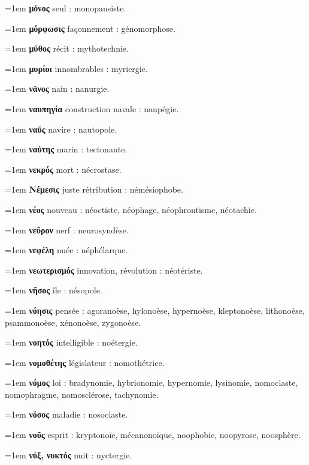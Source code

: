\hangindent=1em \textbf{μόνος} seul : monopausiste.\par
\hangindent=1em \textbf{μόρφωσις} façonnement : génomorphose.\par
\hangindent=1em \textbf{μῦθος} récit : mythotechnie.\par
\hangindent=1em \textbf{μυρίοι} innombrables : myriergie.\par
\hangindent=1em \textbf{νᾶνος} nain : nanurgie.\par
\hangindent=1em \textbf{ναυπηγία} construction navale : naupégie.\par
\hangindent=1em \textbf{ναῦς} navire : nautopole.\par
\hangindent=1em \textbf{ναύτης} marin : tectonaute.\par
\hangindent=1em \textbf{νεκρός} mort : nécrostase.\par
\hangindent=1em \textbf{Νέμεσις} juste rétribution : némésiophobe.\par
\hangindent=1em \textbf{νέος} nouveau : néoctiste, néophage, néophrontisme, néotachie.\par
\hangindent=1em \textbf{νεῦρον} nerf : neurosyndèse.\par
\hangindent=1em \textbf{νεφέλη} nuée : néphélarque.\par
\hangindent=1em \textbf{νεωτερισμός} innovation, révolution : néotériste.\par
\hangindent=1em \textbf{νῆσος} île : nésopole.\par
\hangindent=1em \textbf{νόησις} pensée : agoranoèse, hylonoèse, hypernoèse, kleptonoèse, lithonoèse, psammonoèse, xénonoèse, zygonoèse.\par
\hangindent=1em \textbf{νοητός} intelligible : noétergie.\par
\hangindent=1em \textbf{νομοθέτης} législateur : nomothétrice.\par
\hangindent=1em \textbf{νόμος} loi : bradynomie, hybrionomie, hypernomie, lysinomie, nomoclaste, nomophragme, nomosclérose, tachynomie.\par
\hangindent=1em \textbf{νόσος} maladie : nosoclaste.\par
\hangindent=1em \textbf{νοῦς} esprit : kryptonoïe, mécanonoïque, noophobie, noopyrose, noosphère.\par
\hangindent=1em \textbf{νύξ, νυκτός} nuit : nyctergie.\par
